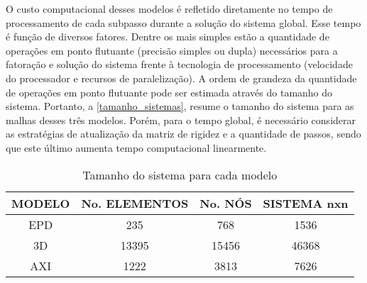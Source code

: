O custo computacional desses modelos é refletido diretamente no tempo de processamento de cada subpasso durante a solução do sistema global. Esse tempo é função de diversos fatores. Dentre os mais simples estão a quantidade de operações em ponto flutuante (precisão simples ou dupla) necessários para a fatoração e solução do sistema frente à tecnologia de processamento (velocidade do processador e recursos de paralelização). A ordem de grandeza da quantidade de operações em ponto flutuante pode ser estimada através do tamanho do sistema. Portanto, a \autoref{tamanho_sistemas}, resume o tamanho do sistema para as malhas desses três modelos. Porém, para o tempo global, é necessário considerar as estratégias de atualização da matriz de rigidez e a quantidade de passos, sendo que este último aumenta tempo computacional linearmente.

\begin{table}[H]
	\caption{Tamanho do sistema para cada modelo}
	\label{tamanho_sistemas}
	\centering
	\small
	\renewcommand{\arraystretch}{1.25}
	\begin{tabular}{c c c c}
		\hline
		\multicolumn{1}{c}{\textbf{MODELO}} &
		\multicolumn{1}{c}{\textbf{No. ELEMENTOS}} &
		\multicolumn{1}{c}{\textbf{No. NÓS}} &
		\multicolumn{1}{c}{\textbf{SISTEMA nxn}} \\
		\hline
		EPD & 235 & 768 & 1536 \\
		3D & 13395 & 15456 & 46368 \\
		AXI & 1222 & 3813 & 7626 \\
		\hline
	\end{tabular}
	\normalsize
\end{table}

